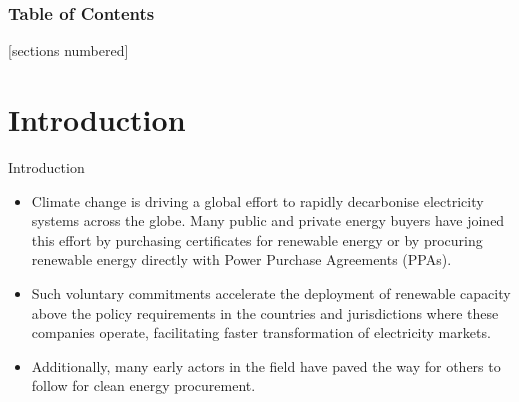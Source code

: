 \begin{frame}

  \frametitle{Table of Contents}
  [sections numbered]
  \tableofcontents[hideallsubsections]
\end{frame}



\section{Introduction}


\begin{frame}{Introduction}

  \centering
    \begin{itemize}
    \item Climate change is driving a global effort to rapidly decarbonise 
    electricity systems across the globe. 
    Many public and private energy buyers have joined this effort 
    by purchasing certificates for renewable energy or
    by procuring renewable energy directly with Power Purchase Agreements (PPAs).
    \item Such \alert{voluntary commitments accelerate the deployment of renewable 
    capacity} above the policy requirements in the countries and jurisdictions
    where these companies operate, facilitating faster
    transformation of electricity markets.
    \item Additionally, many early actors in the field have paved the way for others to follow 
     for clean energy procurement.
    \end{itemize}
  
\end{frame}



